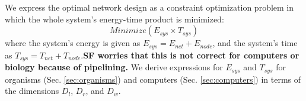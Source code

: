 \documentclass[12pt]{article}
\begin{document}

We express the optimal network design as a constraint optimization 
problem in which the whole system's energy-time product is minimized:
\begin{equation}
Minimize(E_{sys} \times T_{sys})
\label{eq:TheWholeEnchilada}
\end{equation}
where the system's energy is given as $E_{sys} = E_{net} + E_{node}$, 
and the system's time as $T_{sys} = T_{net} + T_{node}$.{\bf SF
  worries that this is not correct for computers or biology because of
  pipelining.}   We derive expressions for $E_{sys}$ and $T_{sys}$
for organisms (Sec. \ref{sec:organisms}) and computers
(Sec. \ref{sec:computers}) in terms of the dimensions $D_l$, $D_r$,
and $D_w$.  




\end{document}
